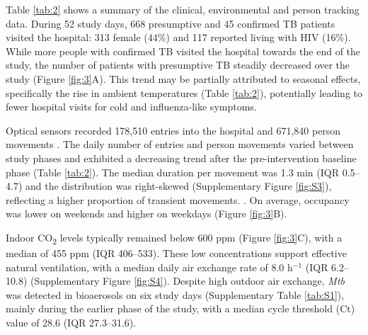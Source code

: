 \documentclass[11pt]{article}
\begin{document}
Table \ref{tab:2} shows a summary of the clinical, environmental and person tracking data. During 52 study days, 668 presumptive and 45 confirmed TB patients visited the hospital: 313 female (44\%) and 117 reported living with HIV (16\%).  While more people with confirmed TB visited the hospital towards the end of the study, the number of patients with presumptive TB steadily decreased over the study (Figure \ref{fig:3}A). This trend may be partially attributed to seasonal effects, specifically the rise in ambient temperatures (Table \ref{tab:2}), potentially leading to fewer hospital visits for cold and influenza-like symptoms.

Optical sensors recorded 178,510 entries into the hospital  and 671,840 person movements . The daily number of entries and person movements varied between study phases and exhibited a decreasing trend after the pre-intervention baseline phase (Table \ref{tab:2}). The median duration per movement was 1.3 min (IQR 0.5--4.7) and the distribution was right-skewed (Supplementary Figure \ref{fig:S3}), reflecting a higher proportion of transient movements. .\label{chg:R2.34} On average, occupancy was lower on weekends and higher on weekdays (Figure \ref{fig:3}B).\label{chg:R2.35}

Indoor CO\textsubscript{2}\hspace{0pt} levels typically remained below 600 ppm (Figure \ref{fig:3}C), with a median of 455 ppm (IQR 406--533). These low concentrations support effective natural ventilation, with a median daily air exchange rate of 8.0 h$^{-1}$ (IQR 6.2--10.8) (Supplementary Figure \ref{fig:S4})\label{chg:R2.14}. Despite high outdoor air exchange, \emph{Mtb} was detected in bioaerosols on six study days (Supplementary Table \ref{tab:S1}), mainly during the earlier phase of the study, with a median cycle threshold (Ct) value of 28.6 (IQR 27.3--31.6).
\end{document}
